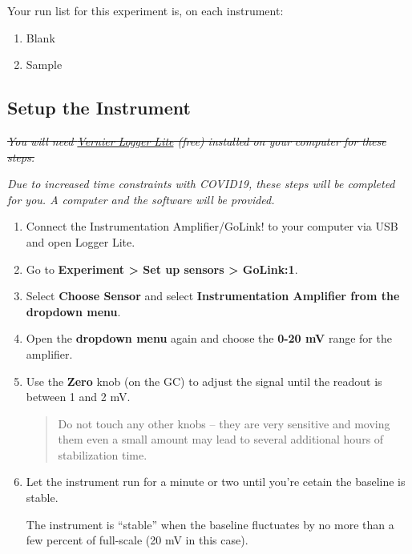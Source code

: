 \documentclass[]{tufte-book}
\providecommand{\tightlist}{%
  \setlength{\itemsep}{0pt}\setlength{\parskip}{0pt}}
\begin{document}
Your run list for this experiment is, on each instrument:

\begin{enumerate}
\def\labelenumi{\arabic{enumi}.}
\tightlist
\item
  Blank
\item
  Sample
\end{enumerate}

\hypertarget{setup-the-instrument}{%
\subsection{Setup the Instrument}\label{setup-the-instrument}}

\sout{\emph{You will need \href{https://www.vernier.com/products/software/logger-lite/\#section5}{Vernier Logger Lite} (free) installed on your computer for these steps.}}

\emph{Due to increased time constraints with COVID19, these steps will be completed for you. A computer and the software will be provided.}

\begin{enumerate}
\def\labelenumi{\arabic{enumi}.}
\item
  Connect the Instrumentation Amplifier/GoLink! to your computer via USB and open Logger Lite.\\
\item
  Go to \textbf{Experiment \textgreater{} Set up sensors \textgreater{} GoLink:1}.\\
\item
  Select \textbf{Choose Sensor} and select \textbf{Instrumentation Amplifier from the dropdown menu}.\\
\item
  Open the \textbf{dropdown menu} again and choose the \textbf{0-20 mV} range for the amplifier.
\item
  Use the \textbf{Zero} knob (on the GC) to adjust the signal until the readout is between 1 and 2 mV.

  \begin{quote}
  Do not touch any other knobs -- they are very sensitive and moving them even a small amount may lead to several additional hours of stabilization time.
  \end{quote}
\item
  Let the instrument run for a minute or two until you're cetain the baseline is stable.

  \begin{marginfigure}
   The instrument is ``stable'' when the baseline fluctuates by no more
   than a few percent of full-scale (20 mV in this case).
   \end{marginfigure}
\end{enumerate}
\end{document}
